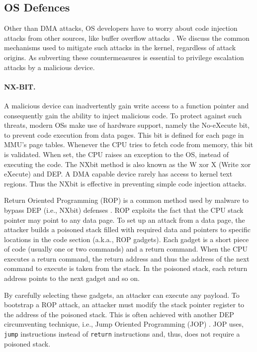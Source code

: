 \subsection{OS Defences}

Other than DMA attacks, OS developers have to worry about code injection attacks from other sources, like buffer overflow attacks \cite{nx, kalsr}.
We discuss the common mechanisms used to mitigate such attacks in the kernel, regardless of attack origins. As subverting these countermeasures is essential to privilege escalation attacks by a malicious device.

\paragraph{NX-BIT.}\label{sec:nx-bit}

A malicious device can inadvertently gain write access to a function pointer and consequently gain the ability to inject malicious code. 
To protect against such threats, modern OSs make use of hardware support, namely the No-eXecute bit, to prevent code execution from data pages. This bit is defined for each page in MMU’s page tables. Whenever the CPU tries to fetch code from memory, this bit is validated. When set, the CPU raises an exception to the OS, instead of executing the code. The NX\-bit method is also known as the W xor X (Write xor eXecute) and DEP. 
A DMA capable device rarely has access to kernel text regions. Thus the NX\-bit is effective in preventing simple code injection attacks.

Return Oriented Programming (ROP) is a common method used by malware to bypass DEP (i.e., NX\-bit) defenses \cite{RBSS12}. ROP exploits the fact that the CPU stack pointer may point to any data page. To set up an attack from a data page, the attacker builds a poisoned stack filled with required data and pointers to specific locations in the code section (a.k.a., ROP gadgets). Each gadget is a short piece of code (usually one or two commands) and a return command. When the CPU executes a return command, the return address and thus the address of the next command to execute is taken from the stack. In the poisoned stack, each return address points to the next gadget and so on. 
 
By carefully selecting these gadgets, an attacker can execute any payload. To bootstrap a ROP attack, an attacker must modify the stack pointer register to the address of the poisoned stack. This is often achieved with another DEP circumventing technique, i.e., Jump Oriented Programming (JOP) \cite{BJFL11}. JOP uses, \texttt{jump} instructions instead of \texttt{return} instructions and, thus, does not require a poisoned stack.

